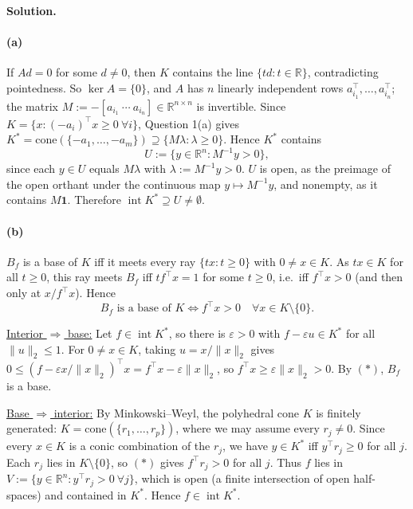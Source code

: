 \documentclass[11pt,letterpaper]{article}
\theoremstyle{definition}
\newcommand{\reals}{\mathbb{R}}
\newcommand{\cone}{\mathrm{cone}}
\newcommand{\solution}{\medskip\noindent\textbf{Solution.}\par\medskip}
\begin{document}
\solution
\paragraph{(a)}
If $Ad=0$ for some $d\neq 0$, then $K$ contains the line $\{td:t\in\reals\}$, contradicting pointedness.
So $\ker A=\{0\}$, and $A$ has $n$ linearly independent rows $a_{i_1}^\top,\dots,a_{i_n}^\top$; the matrix $M:=-[a_{i_1}\ \cdots\ a_{i_n}]\in\reals^{n\times n}$ is invertible.
Since $K=\{x:(-a_i)^\top x\geq 0\ \forall i\}$, Question 1(a) gives $K^*=\cone(\{-a_1,\dots,-a_m\})\supseteq\{M\lambda:\lambda\geq 0\}$.
Hence $K^*$ contains
\[
    U:=\{y\in\reals^n: M^{-1}y>0\},
\]
since each $y\in U$ equals $M\lambda$ with $\lambda:=M^{-1}y>0$.
$U$ is open, as the preimage of the open orthant under the continuous map $y\mapsto M^{-1}y$, and nonempty, as it contains $M\mathbf{1}$.
Therefore $\operatorname{int}K^*\supseteq U\neq\emptyset$.

\paragraph{(b)}
$B_f$ is a base of $K$ iff it meets every ray $\{tx:t\geq 0\}$ with $0\neq x\in K$.
As $tx\in K$ for all $t\geq 0$, this ray meets $B_f$ iff $t f^\top x=1$ for some $t\geq 0$, i.e.\ iff $f^\top x>0$ (and then only at $x/f^\top x$).
Hence
\[
    B_f \text{ is a base of } K \iff f^\top x>0 \quad \forall x\in K\setminus\{0\}. \tag{$*$}
\]

\ul{Interior $\Rightarrow$ base:}
Let $f\in\operatorname{int}K^*$, so there is $\varepsilon>0$ with $f-\varepsilon u\in K^*$ for all $\|u\|_2\leq 1$.
For $0\neq x\in K$, taking $u=x/\|x\|_2$ gives $0\leq (f-\varepsilon x/\|x\|_2)^\top x=f^\top x-\varepsilon\|x\|_2$, so $f^\top x\geq\varepsilon\|x\|_2>0$.
By $(*)$, $B_f$ is a base.

\ul{Base $\Rightarrow$ interior:}
By Minkowski--Weyl, the polyhedral cone $K$ is finitely generated: $K=\cone(\{r_1,\dots,r_p\})$, where we may assume every $r_j\neq 0$.
Since every $x\in K$ is a conic combination of the $r_j$, we have $y\in K^*$ iff $y^\top r_j\geq 0$ for all $j$.
Each $r_j$ lies in $K\setminus\{0\}$, so $(*)$ gives $f^\top r_j>0$ for all $j$.
Thus $f$ lies in $V:=\{y\in\reals^n: y^\top r_j>0\ \forall j\}$, which is open (a finite intersection of open half-spaces) and contained in $K^*$.
Hence $f\in\operatorname{int}K^*$.
\end{document}
